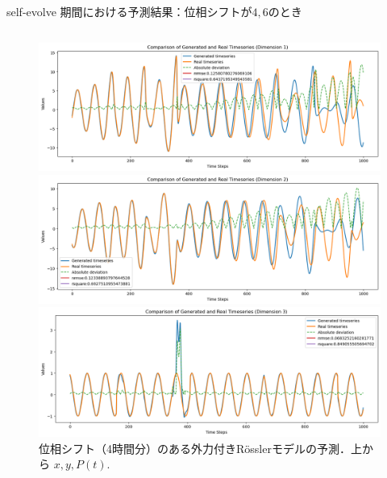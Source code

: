   \begin{frame}{self-evolve 期間における予測結果：位相シフトが$4, 6$のとき}
  \begin{columns}[T] %
    \begin{column}{.5\textwidth}
        \begin{figure}
            \vspace{-.5cm}
            \begin{minipage}[c][.27\textheight][c]{\linewidth}
              \centering
              \includegraphics[width=0.7\linewidth]{Fig/4.x.png}
            \end{minipage}
        
            \vspace{-.5em}
    
            \begin{minipage}[c][.27\textheight][c]{\linewidth}
              \centering
              \includegraphics[width=0.7\linewidth]{Fig/4.y.png}
            \end{minipage}
            
            \vspace{.5em}
            \begin{minipage}[c][.27\textheight][c]{\linewidth}
              \centering
              \includegraphics[width=0.7\linewidth]{Fig/4.p.png}
              \caption{\scriptsize{位相シフト（4時間分）のある外力付きRösslerモデルの予測．上から $x, y, P(t)$. }}
            \end{minipage}
          \end{figure}


\end{column}
\end{columns}
\end{frame}
